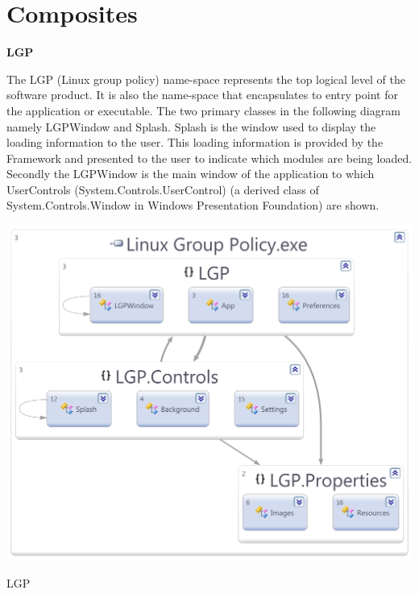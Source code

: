 \section{Composites}

	\large{\bfseries{LGP}}
	\vspace{5mm}
	
		\normalsize
		{	
			The LGP (Linux group policy) name-space represents the top logical level of the software product.  It is also the name-space that encapsulates 
			to entry point for the application or executable.   
			\newline
			\newline
			The two primary classes in the following diagram namely LGPWindow and Splash.
			Splash is the window used to display the loading information to the user. This loading information is provided by the Framework and presented
			to the user to indicate which modules are being loaded.  
			\newline
			\newline
			Secondly the LGPWindow is the main window of the application to which UserControls (System.Controls.UserControl)
			(a derived class of System.Controls.Window in Windows Presentation Foundation) are shown.
		}
		
		\vspace{5mm}
	
		\begin{figurehere}
			\centering
			\includegraphics[scale=0.4]{pages/appendix3/figures/dllscreens/lgp.png}
			\caption{LGP}
		\end{figurehere}
		
